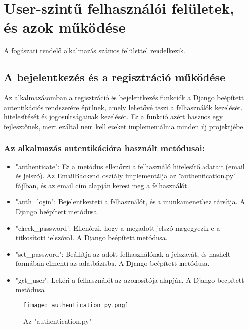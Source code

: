 \chapter{User-szintű felhasználói felületek, és azok működése}
\label{chap:fejezet5}

A fogászati rendelő alkalmazás számos felülettel rendelkezik.

\section{A bejelentkezés és a regisztráció működése}

Az alkalmazásomban a regisztráció és bejelentkezés funkciók a Django beépített autentikációs rendszerére épülnek, amely lehetővé teszi a felhasználók kezelését, hitelesítését és jogosultságainak kezelését. Ez a funkció azért hasznos egy fejlesztőnek, mert ezáltal nem kell ezeket implementálnia minden új projektjébe.

\subsection{Az alkalmazás autentikációra használt metódusai:}

\begin{itemize}
	\item "authenticate": Ez a metódus ellenőrzi a felhasználó hitelesítő adatait (email és jelszó). Az EmailBackend osztály implementálja az "authentication.py" fájlban, és az email cím alapján keresi meg a felhasználót.
	\item "auth\_login": Bejelentkezteti a felhasználót, és a munkamenethez társítja. A Django beépített metódusa.
	\item "check\_password": Ellenőrzi, hogy a megadott jelszó megegyezik-e a titkosított jelszóval. A Django beépített metódusa.
	\item "set\_password": Beállítja az adott felhasználónak a jelszavát, és hashelt formában elmenti az adatbázisba. A Django beépített metódusa.
	\item "get\_user": Lekéri a felhasználót az azonosítója alapján. A Django beépített metódusa.
\end{itemize}

\begin{figure}[H]
	\caption{Az "authentication.py"}
	\label{fig:authentication}
	\centering
	\texttt{[image: authentication\_py.png]}
\end{figure}

